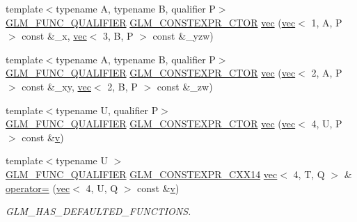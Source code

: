 \begin{DoxyCompactItemize}
{\footnotesize template$<$typename A, typename B, qualifier P$>$ }\\\mbox{\hyperlink{setup_8hpp_a33fdea6f91c5f834105f7415e2a64407}{G\+L\+M\+\_\+\+F\+U\+N\+C\+\_\+\+Q\+U\+A\+L\+I\+F\+I\+ER}} \mbox{\hyperlink{setup_8hpp_ad34178a09666081abdb573c14d1f4a5a}{G\+L\+M\+\_\+\+C\+O\+N\+S\+T\+E\+X\+P\+R\+\_\+\+C\+T\+OR}} \mbox{\hyperlink{structglm_1_1vec_3_014_00_01_t_00_01_q_01_4_a25424f78a9e0345486eeaafbcd1c8a7e}{vec}} (\mbox{\hyperlink{structglm_1_1vec}{vec}}$<$ 1, A, P $>$ const \&\+\_\+x, \mbox{\hyperlink{structglm_1_1vec}{vec}}$<$ 3, B, P $>$ const \&\+\_\+yzw)
\item 
{\footnotesize template$<$typename A, typename B, qualifier P$>$ }\\\mbox{\hyperlink{setup_8hpp_a33fdea6f91c5f834105f7415e2a64407}{G\+L\+M\+\_\+\+F\+U\+N\+C\+\_\+\+Q\+U\+A\+L\+I\+F\+I\+ER}} \mbox{\hyperlink{setup_8hpp_ad34178a09666081abdb573c14d1f4a5a}{G\+L\+M\+\_\+\+C\+O\+N\+S\+T\+E\+X\+P\+R\+\_\+\+C\+T\+OR}} \mbox{\hyperlink{structglm_1_1vec_3_014_00_01_t_00_01_q_01_4_a6273e714a533a4354356ad4a130bf535}{vec}} (\mbox{\hyperlink{structglm_1_1vec}{vec}}$<$ 2, A, P $>$ const \&\+\_\+xy, \mbox{\hyperlink{structglm_1_1vec}{vec}}$<$ 2, B, P $>$ const \&\+\_\+zw)
\item 
{\footnotesize template$<$typename U, qualifier P$>$ }\\\mbox{\hyperlink{setup_8hpp_a33fdea6f91c5f834105f7415e2a64407}{G\+L\+M\+\_\+\+F\+U\+N\+C\+\_\+\+Q\+U\+A\+L\+I\+F\+I\+ER}} \mbox{\hyperlink{setup_8hpp_ad34178a09666081abdb573c14d1f4a5a}{G\+L\+M\+\_\+\+C\+O\+N\+S\+T\+E\+X\+P\+R\+\_\+\+C\+T\+OR}} \mbox{\hyperlink{structglm_1_1vec_3_014_00_01_t_00_01_q_01_4_a057f137a7b9cd18c6277dd4bc7f90335}{vec}} (\mbox{\hyperlink{structglm_1_1vec}{vec}}$<$ 4, U, P $>$ const \&\mbox{\hyperlink{_s_d_l__opengl_8h_a10a82eabcb59d2fcd74acee063775f90}{v}})
\item 
{\footnotesize template$<$typename U $>$ }\\\mbox{\hyperlink{setup_8hpp_a33fdea6f91c5f834105f7415e2a64407}{G\+L\+M\+\_\+\+F\+U\+N\+C\+\_\+\+Q\+U\+A\+L\+I\+F\+I\+ER}} \mbox{\hyperlink{setup_8hpp_a4dd12abf5e1164bc57f3a34671d03844}{G\+L\+M\+\_\+\+C\+O\+N\+S\+T\+E\+X\+P\+R\+\_\+\+C\+X\+X14}} \mbox{\hyperlink{structglm_1_1vec}{vec}}$<$ 4, T, Q $>$ \& \mbox{\hyperlink{structglm_1_1vec_3_014_00_01_t_00_01_q_01_4_a47b604569998091880bd33056928ab50}{operator=}} (\mbox{\hyperlink{structglm_1_1vec}{vec}}$<$ 4, U, Q $>$ const \&\mbox{\hyperlink{_s_d_l__opengl_8h_a10a82eabcb59d2fcd74acee063775f90}{v}})
\begin{DoxyCompactList}\small\item\em G\+L\+M\+\_\+\+H\+A\+S\+\_\+\+D\+E\+F\+A\+U\+L\+T\+E\+D\+\_\+\+F\+U\+N\+C\+T\+I\+O\+NS. \end{DoxyCompactList}\item 

\end{DoxyCompactItemize}
